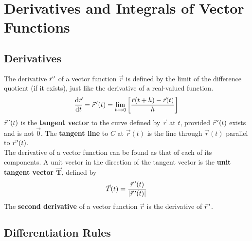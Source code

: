 \documentclass[../Calculus_\Roman{3}]{subfiles}
\begin{document}
	\section{Derivatives and Integrals of Vector Functions}
		\subsection*{Derivatives}
				The derivative $\vec{r}\hspace{0.5mm}'$ of a vector function $\vec{r}$ is defined by the limit of the difference quotient (if it exists), just like the derivative of a real-valued function.
					\[\frac{\mathrm{d} \vec{r}}{\mathrm{d} t} = \vec{r}\hspace{0.5mm}'(t) = \lim_{h\to 0}\left[\frac{\vec{r}(t + h) - \vec{r}(t)}{h}\right]\]
				$\vec{r}\hspace{0.5mm}'(t)$ is the \textbf{tangent vector} to the curve defined by $\vec{r}$ at $t$, provided $\vec{r}\hspace{0.5mm}'(t)$ exists and is not $\vec{0}$. The \textbf{tangent line} to $C$ at $\vec{r}(t)$ is the line through $\vec{r}(t)$ parallel to $\vec{r}\hspace{0.5mm}'(t)$. \\
				The derivative of a vector function can be found as that of each of its components.
				A unit vector in the direction of the tangent vector is the \textbf{unit tangent vector $\bm{\vec{T}}$}, defined by
					\[\vec{T}(t) = \frac{\vec{r}\hspace{0.5mm}'(t)}{|\vec{r}\hspace{0.5mm}'(t)|}\]
				The \textbf{second derivative} of a vector function $\vec{r}$ is the derivative of $\vec{r}\hspace{0.5mm}'$.
			\subsection*{Differentiation Rules}
\end{document}
